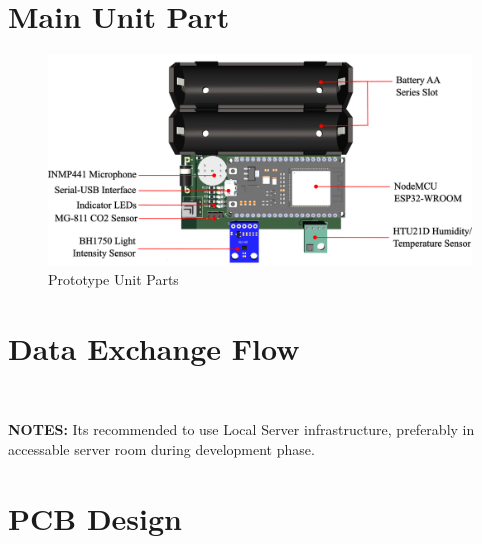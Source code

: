 \documentclass[a4paper,12pt,oneside,pdflatex,italian,final,twocolumn]{article}
\begin{document}
	\raggedright
	\section{Main Unit Part}
	
	\centering
	\begin{figure}[!ht]
		\centering
		\includegraphics[width=\textwidth,]{images/node_part.png}
		\caption{Prototype Unit Parts}
	\end{figure}

	\raggedright
	\section{Data Exchange Flow}
	
	\\
	
	\vspace{10pt}
	
	\textbf{NOTES:} Its recommended to use Local Server infrastructure, preferably in accessable server room during development phase.
	
	\raggedright
	\section{PCB Design}
	
	\newpage
	
	
	\newpage
	
\end{document}
